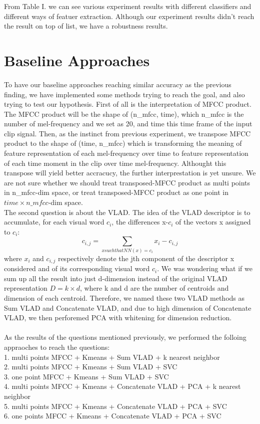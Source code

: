 \documentclass[final]{siamltexmm}
\begin{document}
From Table I. we can see various experiment results with different classifiers and different ways of featuer extraction.  Although our experiment results didn't reach the result on top of list, we have a robustness results.  %

\section{Baseline Approaches}
To have our baseline approaches reaching similar accuracy as the previous finding, we have implemented some methods trying to reach the goal, and also trying to test our hypothesis. First of all is the interpretation of MFCC product. The MFCC product will be the shape of (n\_mfcc, time), which n\_mfcc is the number of mel-frequency and we set as 20, and time this time frame of the input clip signal. Then, as the instinct from previous experiment, we transpose MFCC product to the shape of (time, n\_mfcc) which is transforming the meaning of feature representation of each mel-frequency over time to feature representation of each time moment in the clip over time mel-frequency. Althought this transpose will yield better accracucy, the further interprestation is yet unsure. We are not sure whether we should treat transposed-MFCC product as multi points in n\_mfcc-dim space, or treat transposed-MFCC product as one point in $time \times n\_mfcc$-dim space.
\\The second question is about the VLAD. The idea of the VLAD descriptor is to accumulate, for each visual word $c_{i}$, the differences x-$c_{i}$ of the vectors x assigned to $c_{i}$:
\begin{equation}
c_{i, j} = \sum\limits_{x such that NN(x)=c_{i}} x_{i}-c_{i,j}
\end{equation}
where $x_{i}$ and $c_{i,j}$ respectively denote the jth component of the descriptor x considered and of its corresponding visual word $c_{i}$. We was wondering what if we sum up all the result into just d-dimension instead of the original VLAD representation $D=k\times d$, where k and d are the number of centroids and dimension of each centroid. Therefore, we named these two VLAD methods as Sum VLAD and Concatenate VLAD, and due to high dimension of Concatenate VLAD, we then perforemed PCA with whitening for dimension reduction.
\\\\As the results of the questions mentioned previously, we performed the folloing appraoches to reach the questions:
\\ 1. multi points MFCC + Kmeans + Sum VLAD + k nearest neighbor
\\ 2. multi points MFCC + Kmeans + Sum VLAD + SVC
\\ 3. one point MFCC + Kmeans + Sum VLAD + SVC
\\ 4. multi points MFCC + Kmeans + Concatenate VLAD + PCA + k nearest neighbor
\\ 5. multi points MFCC + Kmeans + Concatenate VLAD + PCA + SVC
\\ 6. one points MFCC + Kmeans + Concatenate VLAD + PCA + SVC
\end{document}
